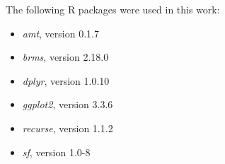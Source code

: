 The following R packages were used in this work:
\begin{itemize}
    \item \textit{amt}, version 0.1.7
    \item \textit{brms}, version 2.18.0
    \item \textit{dplyr}, version 1.0.10
    \item \textit{ggplot2}, version 3.3.6
    \item \textit{recurse}, version 1.1.2
    \item \textit{sf}, version 1.0-8
\end{itemize}